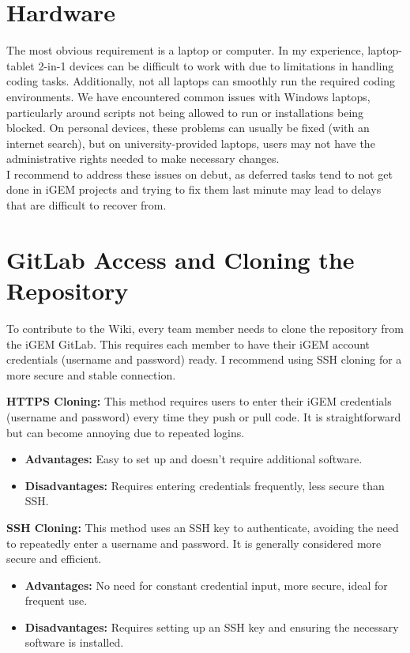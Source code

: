 

\section{Hardware} \label{sec:hardware}
The most obvious requirement is a laptop or computer.
In my experience, laptop-tablet 2-in-1 devices can be difficult to work with due to limitations in handling coding tasks.
Additionally, not all laptops can smoothly run the required coding environments.
We have encountered common issues with Windows laptops, particularly around scripts not being allowed to run or installations being blocked.
On personal devices, these problems can usually be fixed (with an internet search), but on university-provided
laptops, users may not have the administrative rights needed to make necessary changes. \\ \newline
I recommend to address these issues on debut, as deferred tasks tend to not get done in iGEM projects and trying to fix
them last minute may lead to delays that are difficult to recover from.


\section{GitLab Access and Cloning the Repository} \label{sec:gitlab}
To contribute to the Wiki, every team member needs to clone the repository from the iGEM GitLab.
This requires each member to have their iGEM account credentials (username and password) ready.
I recommend using SSH cloning for a more secure and stable connection. \\ \newline

\textbf{HTTPS Cloning:} This method requires users to enter their iGEM credentials (username and password) every time they push or pull code.
It is straightforward but can become annoying due to repeated logins. 
\begin{itemize}
    \item \textbf{Advantages:} Easy to set up and doesn't require additional software.
    \item \textbf{Disadvantages:} Requires entering credentials frequently, less secure than SSH\@.
\end{itemize}
\textbf{SSH Cloning:} This method uses an SSH key to authenticate, avoiding the need to repeatedly enter a username and password.
It is generally considered more secure and efficient.
\begin{itemize}
    \item \textbf{Advantages:} No need for constant credential input, more secure, ideal for frequent use.
    \item \textbf{Disadvantages:} Requires setting up an SSH key and ensuring the necessary software is installed.
\end{itemize}

